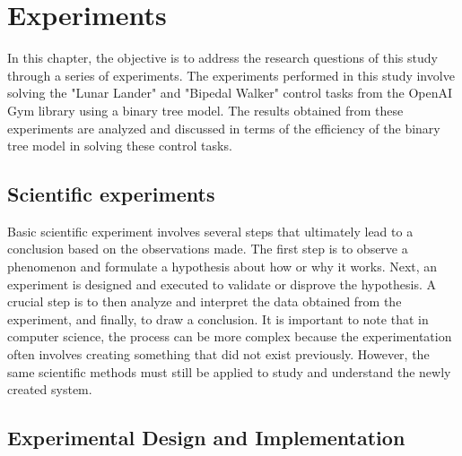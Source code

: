 \chapter{Experiments}
\label{ch:experiments}

In this chapter, the objective is to address the research questions of this study through a series of experiments. The experiments performed in this study involve solving the "Lunar Lander" and "Bipedal Walker" control tasks from the OpenAI Gym library using a binary tree model. The results obtained from these experiments are analyzed and discussed in terms of the efficiency of the binary tree model in solving these control tasks.

\section{Scientific experiments}
Basic scientific experiment involves several steps that ultimately lead to a conclusion based on the observations made. The first step is to observe a phenomenon and formulate a hypothesis about how or why it works. Next, an experiment is designed and executed to validate or disprove the hypothesis. A crucial step is to then analyze and interpret the data obtained from the experiment, and finally, to draw a conclusion. It is important to note that in computer science, the process can be more complex because the experimentation often involves creating something that did not exist previously. However, the same scientific methods must still be applied to study and understand the newly created system.

\section{Experimental Design and Implementation}

